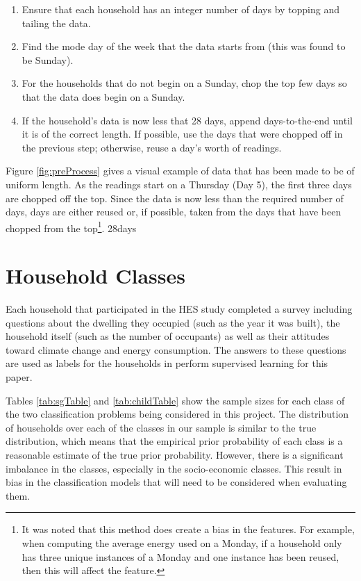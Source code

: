 \begin{enumerate}
\item Ensure that each household has an integer number of days by topping and tailing the data.
\item Find the mode day of the week that the data starts from (this was found to be Sunday).
\item For the households that do not begin on a Sunday, chop the top few days so that the data does begin on a Sunday.
\item If the household's data is now less that 28 days, append days-to-the-end until it is of the correct length. If possible, use the days that were chopped off in the previous step; otherwise, reuse a day's worth of readings.
\end{enumerate}

Figure \ref{fig:preProcess} gives a visual example of data that has been made to be of uniform length. As the readings start on a Thursday (Day 5), the first three days are chopped off the top. Since the data is now less than the required number of days, days are either reused or, if possible, taken from the days that have been chopped from the top\footnote{It was noted that this method does create a bias in the features. For example, when computing the average energy used on a Monday, if a household only has three unique instances of a Monday and one instance has been reused, then this will affect the feature.}.
\to28days

\section{Household Classes}

Each household that participated in the HES study completed a survey including questions about the dwelling they occupied (such as the year it was built), the household itself (such as the number of occupants) as well as their attitudes toward climate change and energy consumption. The answers to these questions are used as labels for the households in perform supervised learning for this paper.

\sgTable

Tables \ref{tab:sgTable} and \ref{tab:childTable} show the sample sizes for each class of the two classification problems being considered in this project. The distribution of households over each of the classes in our sample is similar to the true distribution, which means that the empirical prior probability of each class is a reasonable estimate of the true prior probability. However, there is a significant imbalance in the classes, especially in the socio-economic classes. This result in bias in the classification models that will need to be considered when evaluating them.
\childTable

